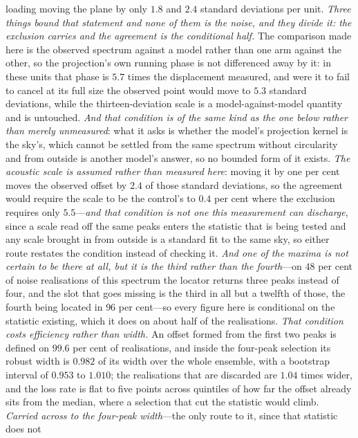 \documentclass[11pt,a4paper]{article}
\theoremstyle{plain}
\theoremstyle{definition}
\theoremstyle{remark}
\begin{document}
loading moving the plane by only $1.8$ and $2.4$ standard deviations per unit. \emph{Three things
bound that statement and none of them is the noise, and they divide it: the exclusion carries and the
agreement is the conditional half.} The comparison made here is the observed spectrum against a model
rather than one arm against the other, so the projection's own running phase is not differenced away
by it: in these units that phase is $5.7$ times the displacement measured, and were it to fail to
cancel at its full size the observed point would move to $5.3$ standard deviations, while the
thirteen-deviation scale is a model-against-model quantity and is untouched. \emph{And that condition
is of the same kind as the one below rather than merely unmeasured}: what it asks is whether the
model's projection kernel is the sky's, which cannot be settled from the same spectrum without
circularity and from outside is another model's answer, so no bounded form of it exists. \emph{The
acoustic scale
is assumed rather than measured here}: moving it by one per cent moves the observed offset by $2.4$ of
those standard deviations, so the agreement would require the scale to be the control's to $0.4$ per
cent where the exclusion requires only $5.5$---\emph{and that condition is not one this measurement
can discharge}, since a scale read off the same peaks enters the statistic that is being tested and
any scale brought in from outside is a standard fit to the same sky, so either route restates the
condition instead of checking it. \emph{And one of the maxima is not certain to be there at all, but
it is the third rather than the fourth}---on $48$ per cent of noise realisations of this spectrum the
locator returns
three peaks instead of four, and the slot that goes missing is the third in all but a twelfth of
those, the fourth being located in $96$ per cent---so every figure here is conditional on the
statistic existing, which it does on about half of the realisations. \emph{That condition costs
efficiency rather than width.} An offset formed from the first two peaks is defined on $99.6$ per
cent of realisations, and inside the four-peak selection its robust width is $0.982$ of its width
over the whole ensemble, with a bootstrap interval of $0.953$ to $1.010$; the realisations that are
discarded are $1.04$ times wider, and the loss rate is flat to five points across quintiles of how
far the offset already sits from the median, where a selection that cut the statistic would climb.
\emph{Carried across to the four-peak width}---the only route to it, since that statistic does not
\end{document}
